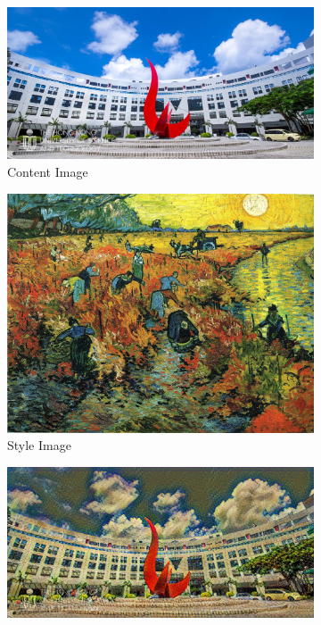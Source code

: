 \documentclass{article}
\begin{document}
\begin{figure}[h!]
    \begin{minipage}{\textwidth}
        \centering
        \begin{subfigure}{0.25\textwidth}
            \includegraphics[width=\textwidth]{./data_set/HKUST/3.jpg}
            \caption{Content Image}
        \end{subfigure}
        \hfill %
        \begin{subfigure}{0.25\textwidth}
            \includegraphics[width=\textwidth]{./wikiart/Post_Impressionism/vincent-van-gogh_red-vineyards-at-arles-1888.jpg}
            \caption{Style Image}
        \end{subfigure}
        \hfill %
        \begin{subfigure}{0.25\textwidth}
            \includegraphics[width=\textwidth]{./part1_inference/output_3_vincent-van-gogh_red-vineyards-at-arles-1888.jpg}

\end{subfigure}
\end{minipage}
\end{figure}
\end{document}
